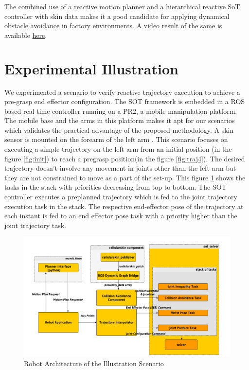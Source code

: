 The combined use of a reactive motion planner and a hierarchical reactive SoT controller with skin data makes it a good candidate for applying dynamical obstacle avoidance in factory environments.
A video result of the same is available \href{https://youtu.be/uLStjR7mpOI}{here}.
\section{Experimental Illustration}
We experimented a scenario to verify reactive trajectory execution to achieve a pre-grasp end effector configuration. The SOT framework is embedded in a ROS based real time controller running on a PR2, a mobile manipulation platform. The mobile base and the arms in this platform makes it apt for our scenarios which validates the practical advantage of the proposed methodology. A skin sensor is mounted on the forearm of the left arm . This scenario focuses on executing a simple trajectory on the left arm from an initial position (in the figure \ref{fig:init}) to reach a pregrasp position(in the figure \ref{fig:traj4}). The desired trajectory doesn't involve any movement in joints other than the left arm but they are not constrained to move as a part of the set-up. This figure \ref{ExperimentA} shows the tasks in the stack with priorities decreasing from top to bottom. 
 The SOT controller executes a preplanned trajectory which is fed to the joint trajectory execution task in the stack. The respective end-effector pose of the trajectory at each instant is fed to an end effector pose task with a priority higher than the joint trajectory task.
    \begin{figure}[h]
      \centering
      \includegraphics[scale=0.21]{doa/images/expillustration.png}
      \caption{Robot Architecture of the Illustration Scenario}
      \label{ExperimentA}
   \end{figure}
 
